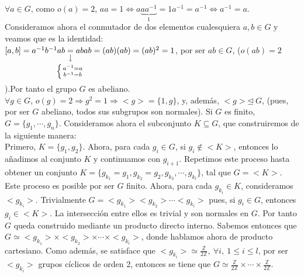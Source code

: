 \documentclass{article}
\newcommand{\nota}[3][2ex]{
    \underset{\mathclap{
        \begin{tikzpicture}
          \draw[<-] (0, 0) to ++(0,#1);
          \node[below] at (0,0) {#3};
        \end{tikzpicture}}}{#2}
}
\begin{document}
$\forall a \in G$, como $o(a) = 2$, $aa = 1 \Leftrightarrow a\underbrace{aa^{-1}}_{1} = 1a^{-1} = a^{-1} \Leftrightarrow a^{-1} = a$. Consideramos ahora el conmutador de dos elementos cualesquiera $a,b \in G$ y veamos que es la identidad:\\
$[a, b] = a^{-1}b^{-1}ab \nota{=}{$
\left\lbrace
a^{-1} = a \atop
b^{-1} = b
\right.
$}{} abab = (ab)(ab) = (ab)^2 = 1$, por ser $ab \in G$, ($o(ab) = 2$).Por tanto el grupo $G$ es abeliano.\\
$\forall g \in G$, $o(g) = 2 \Rightarrow g^2 = 1 \Rightarrow <g> = \{1, g\}$, y, además, $<g> \unlhd \ G$, (pues, por ser $G$ abeliano, todos sus subgrupos son normales). Si $G$ es finito, $G = \{g_1, \cdots , g_n\}$. Consideramos ahora el subconjunto $K \subseteq G$, que construiremos de la siguiente manera:\\
Primero, $K = \{g_1, g_2\}$. Ahora, para cada $g_i \in G$, si $g_i \not \in <K>$, entonces lo añadimos al conjunto $K$ y continuamos con $g_{i + 1}$. Repetimos este proceso hasta obtener un conjunto $K = \{g_{k_1} = g_1, g_{k_2} = g_2, g_{k_3}, \cdots , g_{k_l}\}$, tal que $G = <K>$. Este proceso es posible por ser $G$ finito. Ahora, para cada $g_{k_i} \in K$, consideramos $<g_{k_i}>$. Trivialmente $G = <g_{k_1}> <g_{k_2}> \cdots <g_{k_l}>$ pues, si $g_i \in G$, entonces $g_i \in <K>$. La intersección entre ellos es trivial y son normales en $G$. Por tanto $G$ queda construido mediante un producto directo interno. Sabemos entonces que $G \simeq <g_{k_1}> \times <g_{k_2}> \times \cdots \times <g_{k_l}>$, donde hablamos ahora de producto cartesiano. Como además, se satisface que $<g_{k_i}> \simeq \frac{\mathbb{Z}}{2\mathbb{Z}},\ \forall i, \ 1 \leqslant i \leqslant l$, por ser $<g_{k_i}>$ grupos cíclicos de orden 2, entonces se tiene que $G \simeq \frac{\mathbb{Z}}{2\mathbb{Z}} \times \cdots \times \frac{\mathbb{Z}}{2\mathbb{Z}}$.\\
\end{document}
